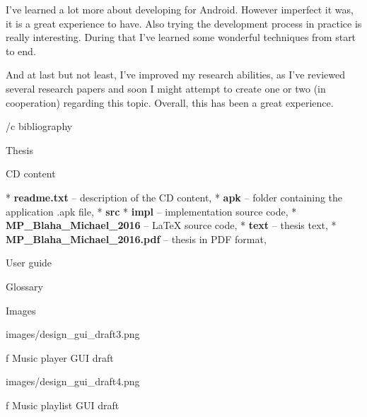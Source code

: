 I've learned a lot more about developing for Android. However imperfect it was, it is a great experience to have. Also trying the  development process in practice is really interesting. During that I've learned some wonderful techniques from start to end.

And at last but not least, I've improved my research abilities, as I've reviewed several research papers and soon I might attempt to create one or two (in cooperation) regarding this topic. Overall, this has been a great experience.


\bibchap
\usebbl/c bibliography



\app Thesis


\app CD content


\begitems
* {\bf readme.txt} -- description of the CD content,
* {\bf apk} -- folder containing the application .apk file,
* {\bf src}
	\begitems
	* {\bf impl} -- implementation source code,
	* {\bf MP\_Blaha\_Michael\_2016} -- \LaTeX{} source code,
	\enditems
* {\bf text} -- thesis text,
	\begitems
	* {\bf MP\_Blaha\_Michael\_2016.pdf} -- thesis in PDF format,
	\enditems
\enditems

\app User guide


\app Glossary\par \makeglos

\app Images

\medskip
\centerline{
\inspic images/design_gui_draft3.png
}
\nobreak\medskip
\caption/f Music player GUI draft
\medskip

\centerline{
\inspic images/design_gui_draft4.png
}
\nobreak\medskip
\caption/f Music playlist GUI draft
\medskip

